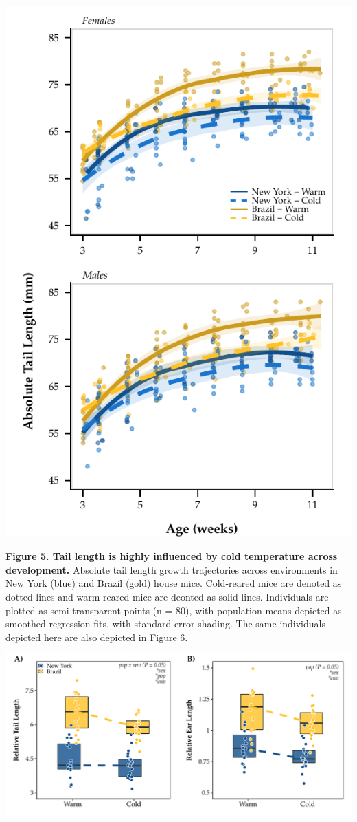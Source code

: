 \documentclass[]{article}
\begin{document}
\newpage

\includegraphics{../results/figures/Weekly_Tails.pdf}

\textbf{Figure 5. Tail length is highly influenced by cold temperature
across development.} Absolute tail length growth trajectories across
environments in New York (blue) and Brazil (gold) house mice.
Cold-reared mice are denoted as dotted lines and warm-reared mice are
deonted as solid lines. Individuals are plotted as semi-transparent
points (n = 80), with population means depicted as smoothed regression
fits, with standard error shading. The same individuals depicted here
are also depicted in Figure 6.

\newpage

\includegraphics{../results/figures/RXNs_Extremities_relative.pdf}
\end{document}
